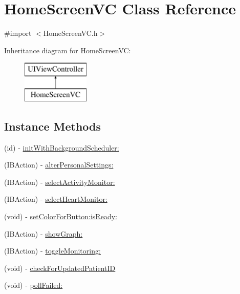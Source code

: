 \hypertarget{interface_home_screen_v_c}{\section{Home\-Screen\-V\-C Class Reference}
\label{interface_home_screen_v_c}
}


{\ttfamily \#import $<$Home\-Screen\-V\-C.\-h$>$}

Inheritance diagram for Home\-Screen\-V\-C\-:\begin{figure}[H]
\begin{center}
\leavevmode
\includegraphics[height=2.000000cm]{interface_home_screen_v_c}
\end{center}
\end{figure}
\subsection*{Instance Methods}
\begin{DoxyCompactItemize}
\item 
(id) -\/ \hyperlink{interface_home_screen_v_c_aba4765dac13e0c3829c52a23d6c6b773}{init\-With\-Background\-Scheduler\-:}
\item 
(I\-B\-Action) -\/ \hyperlink{interface_home_screen_v_c_a8a98314cf71cd518e63b9ce589b35f02}{alter\-Personal\-Settings\-:}
\item 
(I\-B\-Action) -\/ \hyperlink{interface_home_screen_v_c_a3b9db379f6432201f499008c3918fa5f}{select\-Activity\-Monitor\-:}
\item 
(I\-B\-Action) -\/ \hyperlink{interface_home_screen_v_c_a9cf7d44e5fa97a7f70e116ba0b4c6b2c}{select\-Heart\-Monitor\-:}
\item 
(void) -\/ \hyperlink{interface_home_screen_v_c_ac0077075c9e48561794e5e6818232bd9}{set\-Color\-For\-Button\-:is\-Ready\-:}
\item 
(I\-B\-Action) -\/ \hyperlink{interface_home_screen_v_c_a50a2ea69f594741ce8926b4a8f6382f0}{show\-Graph\-:}
\item 
(I\-B\-Action) -\/ \hyperlink{interface_home_screen_v_c_a7cda2112b655ee8a7b622fbfa2ea0d0f}{toggle\-Monitoring\-:}
\item 
(void) -\/ \hyperlink{interface_home_screen_v_c_a83dbe8e2e8729282f47e1ffaf30b07f4}{check\-For\-Updated\-Patient\-I\-D}
\item 
(void) -\/ \hyperlink{interface_home_screen_v_c_a379c482616bb7911c6e9fc71cf9eb2a0}{poll\-Failed\-:}
\end{DoxyCompactItemize}
